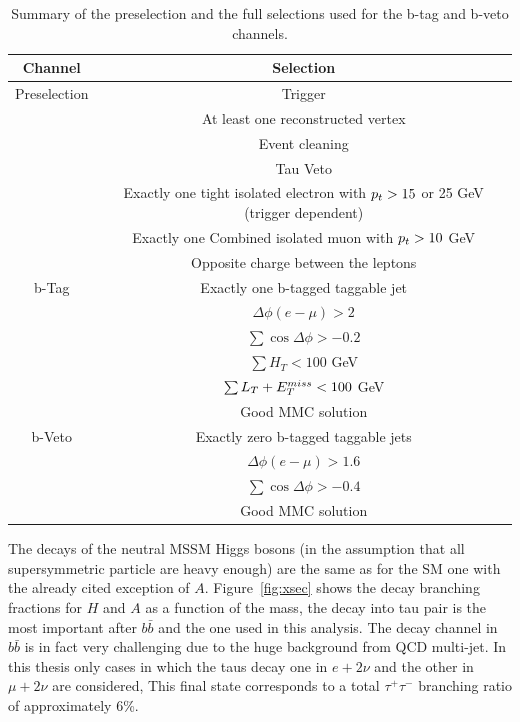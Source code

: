 \begin{table}[t]
  \begin{center}
   \begin{footnotesize}	
    \begin{tabular}{cc}
      \hline \hline
      Channel & Selection \\
      \hline
      Preselection 	&  Trigger \\
	&	At least one reconstructed vertex \\
	&	Event cleaning	\\
	&	Tau Veto \\
	& 	Exactly one tight isolated electron with $p_{t} > 15 $ or 25 GeV (trigger dependent) \\
	&	Exactly one Combined isolated muon with  $p_{t} > 10$ GeV \\
	& 	Opposite charge between the leptons \\ 
      \hline
      b-Tag & Exactly one b-tagged taggable jet \\
      & $\Delta\phi(e-\mu)>2$ \\
      & $\sum\cos\Delta\phi > -0.2$ \\
      & $\sum H_T < 100$ GeV \\
      & $\sum L_{T} + E_{T}^{miss} < 100$ GeV \\
      & Good MMC solution \\
      \hline
      b-Veto & Exactly zero b-tagged taggable jets \\	
      & $\Delta\phi(e-\mu)>1.6$ \\
      & $\sum\cos\Delta\phi > -0.4$ \\
      & Good MMC solution \\
      \hline \hline
    \end{tabular}
    \caption{Summary of the preselection and the full selections used for the b-tag and b-veto channels.}
    \label{tab:sel}
  \end{footnotesize}
  \end{center}
\end{table}

The decays of the neutral
MSSM Higgs bosons (in the assumption that all supersymmetric particle
are heavy enough) are the same as for the SM one with the already
cited exception of $A$. Figure~\ref{fig:xsec} shows the decay branching fractions
for $H$ and $A$ as a function of the mass, 
the decay into tau pair is the most important after $b\bar{b}$ and the one used in this analysis. The 
decay channel in $b\bar{b}$ is in fact very challenging due to the huge background from
QCD multi-jet.
In this thesis only cases in which the taus decay one in $e + 2\nu$ and
the other in $\mu + 2\nu$ are considered, This final state corresponds to a total
$\tau^+\tau^-$ branching ratio of approximately 6\%.
 
